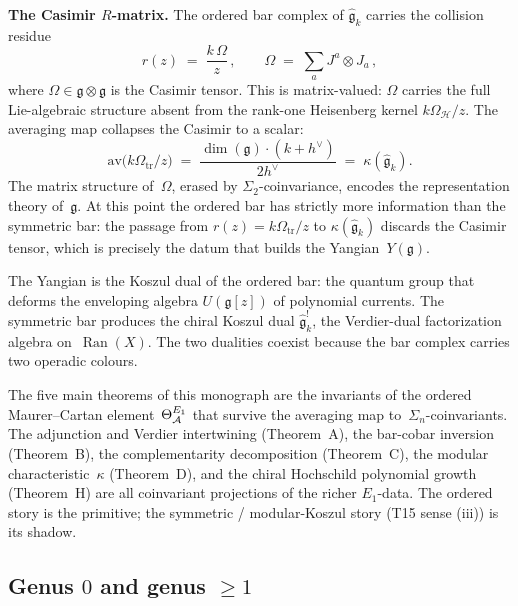\medskip
\noindent\textbf{The Casimir $R$-matrix.}\enspace
The ordered bar complex of $\widehat{\mathfrak g}_k$ carries the
collision residue
\begin{equation}\label{eq:pf1-km-rmatrix}
r(z) \;=\; \frac{k\,\Omega}{z}\,,
\qquad
\Omega \;=\; \sum_a J^a \otimes J_a\,,
\end{equation}
where $\Omega \in \mathfrak g \otimes \mathfrak g$ is the Casimir
tensor. This is matrix-valued: $\Omega$ carries the full
Lie-algebraic structure absent from the rank-one Heisenberg
kernel $k\Omega_{\mathcal H}/z$. The averaging map collapses the Casimir to a
scalar:
\begin{equation}\label{eq:pf1-km-kappa}
\mathrm{av}\bigl(k\Omega_{\mathrm{tr}}/z\bigr)
\;=\;
\frac{\dim(\mathfrak g)\cdot(k+h^\vee)}{2h^\vee}
\;=\;
\kappa(\widehat{\mathfrak g}_k).
\end{equation}
The matrix structure of~$\Omega$, erased by
$\Sigma_2$-coinvariance, encodes the representation theory
of~$\mathfrak g$. At this point the ordered bar has strictly more
information than the symmetric bar: the passage from
$r(z) = k\Omega_{\mathrm{tr}}/z$ to $\kappa(\widehat{\mathfrak g}_k)$ discards
the Casimir tensor, which is precisely the datum that builds the
Yangian~$Y(\mathfrak g)$.

The Yangian is the Koszul dual of the ordered bar: the quantum group
that deforms the enveloping algebra $U(\mathfrak g[z])$ of
polynomial currents. The symmetric bar produces the chiral Koszul
dual $\widehat{\mathfrak g}_k^!$, the Verdier-dual factorization
algebra on~$\operatorname{Ran}(X)$. The two dualities coexist
because the bar complex carries two operadic colours.

The five main theorems of this monograph are the invariants of
the ordered Maurer--Cartan element~$\Theta^{E_1}_{\mathcal{A}}$ that survive
the averaging map to~$\Sigma_n$-coinvariants.
The adjunction and Verdier intertwining (Theorem~A), the bar-cobar
inversion (Theorem~B), the complementarity decomposition
(Theorem~C), the modular characteristic~$\kappa$ (Theorem~D), and
the chiral Hochschild polynomial growth (Theorem~H) are all
coinvariant projections of the richer $E_1$-data.
The ordered story is the primitive; the symmetric / modular-Koszul story (T15 sense (iii)) is its shadow.


\subsection*{Genus $0$ and genus $\ge 1$}

